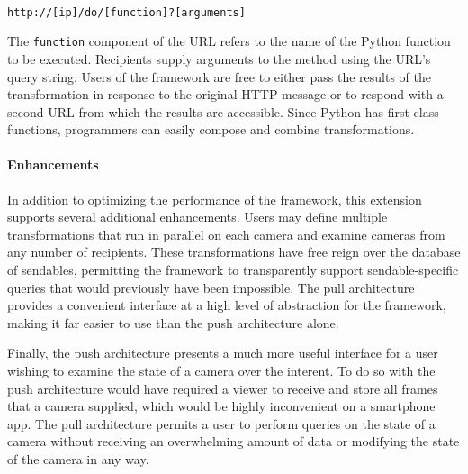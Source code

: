 \texttt{\\http://[ip]/do/[function]?[arguments]\\}

The \texttt{function} component of the URL refers to the name of
the Python function to be executed.  Recipients supply arguments to the method using
the URL's query string.  Users of the framework are free to either
pass the results of the transformation in response to the original HTTP
message or to respond with a second URL from which the results are accessible.
Since Python has first-class functions, programmers can easily 
compose and combine transformations.

\paragraph{Enhancements}

In addition to optimizing the performance of the framework,
this extension supports several additional enhancements.  Users may 
define multiple transformations that run in parallel on each camera and
examine cameras from any number of recipients.  These transformations
have free reign over the database of sendables, permitting
the framework to transparently support sendable-specific queries that
would previously have been impossible.   The pull architecture provides a
convenient interface at a high level of abstraction for the framework, making
it far easier to use than the push architecture alone.

Finally, the push architecture presents a much more useful interface
for a user wishing to examine the state of a camera over the interent.
To do so with the push architecture would have required a viewer to receive
and store all frames that a camera supplied, which would be highly inconvenient on
a smartphone app.  The pull architecture permits a user to perform queries on
the state of a camera without receiving an overwhelming amount of data or
modifying the state of the camera in any way.
